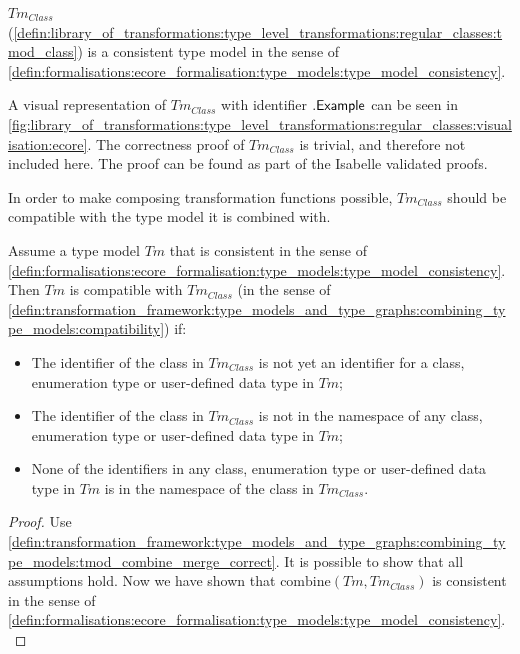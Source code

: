 \begin{thm}
\label{defin:library_of_transformations:type_level_transformations:regular_classes:tmod_class_correct}
$Tm_{Class}$ (\cref{defin:library_of_transformations:type_level_transformations:regular_classes:tmod_class}) is a consistent type model in the sense of \cref{defin:formalisations:ecore_formalisation:type_models:type_model_consistency}.
\end{thm}

A visual representation of $Tm_{Class}$ with identifier $.\mathsf{Example}$ can be seen in \cref{fig:library_of_transformations:type_level_transformations:regular_classes:visualisation:ecore}. The correctness proof of $Tm_{Class}$ is trivial, and therefore not included here. The proof can be found as part of the Isabelle validated proofs.

In order to make composing transformation functions possible, $Tm_{Class}$ should be compatible with the type model it is combined with.

\begin{thm}
\label{defin:library_of_transformations:type_level_transformations:regular_classes:tmod_class_combine_correct}
Assume a type model $Tm$ that is consistent in the sense of \cref{defin:formalisations:ecore_formalisation:type_models:type_model_consistency}. Then $Tm$ is compatible with $Tm_{Class}$ (in the sense of \cref{defin:transformation_framework:type_models_and_type_graphs:combining_type_models:compatibility}) if:
\begin{itemize}
    \item The identifier of the class in $Tm_{Class}$ is not yet an identifier for a class, enumeration type or user-defined data type in $Tm$;
    \item The identifier of the class in $Tm_{Class}$ is not in the namespace of any class, enumeration type or user-defined data type in $Tm$;
    \item None of the identifiers in any class, enumeration type or user-defined data type in $Tm$ is in the namespace of the class in $Tm_{Class}$.
\end{itemize}
\end{thm}

\begin{proof}
Use \cref{defin:transformation_framework:type_models_and_type_graphs:combining_type_models:tmod_combine_merge_correct}. It is possible to show that all assumptions hold. Now we have shown that $\mathrm{combine}(Tm, Tm_{Class})$ is consistent in the sense of \cref{defin:formalisations:ecore_formalisation:type_models:type_model_consistency}.
\end{proof}

